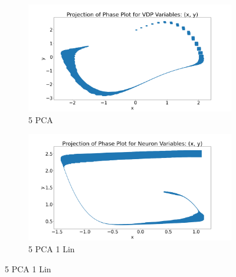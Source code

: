 \begin{figure}[h!]
\begin{subfigure}{0.5\textwidth}
\includegraphics[width=\textwidth]{figures/PhasePlots/VDP_5PCA_.png}
\caption{5 PCA}
\end{subfigure}%
\begin{subfigure}{0.5\textwidth}
\includegraphics[width=\textwidth]{figures/PhasePlots/Neuron_5PCA1Lin_.png}
\caption{5 PCA 1 Lin}
\end{subfigure}


\end{figure}
